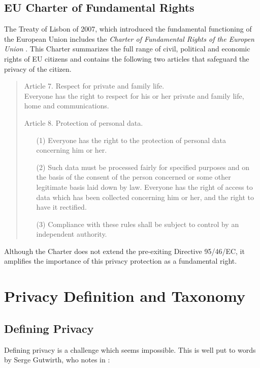 \subsection{EU Charter of Fundamental Rights}
The Treaty of Lisbon of 2007, which introduced the fundamental functioning of the European Union
includes the \emph{Charter of Fundamental Rights of the Europen Union} \cite{EUFR2010}.
This Charter summarizes the full range of civil, political and economic rights of EU citizens and contains the following two articles that safeguard the privacy of the citizen.

\begin{quote}
  Article 7. Respect for private and family life.\\
  Everyone has the right to respect for his or her private and family life, home and communications.

  Article 8. Protection of personal data.
  \begin{enumerate}
    \item [(1)] Everyone has the right to the protection of personal data concerning him or her.
    \item [(2)] Such data must be processed fairly for specified purposes and on the basis of the consent of the person concerned or some other legitimate basis laid down by law.
      Everyone has the right of access to data which has been collected concerning him or her, and the right to have it rectified.
    \item [(3)] Compliance with these rules shall be subject to control by an independent authority.
  \end{enumerate}
\end{quote}

Although the Charter does not extend the pre-exiting Directive 95/46/EC, it amplifies the importance of this privacy protection as a fundamental right.

\section{Privacy Definition and Taxonomy}
\label{sec:taxonomy}

\subsection{Defining Privacy}


Defining privacy is a challenge which seems impossible. This is well put to words by Serge Gutwirth, who notes in \cite{Gutwirth}:

